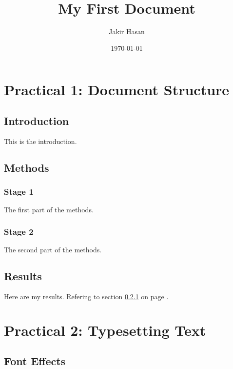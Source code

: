 \documentclass[a4paper, 12pt]{report}
\begin{document}
\title{My First Document}
\author{Jakir Hasan}
\date{\today}
\maketitle

\tableofcontents
\listoftables
\listoffigures
\newpage
{}

\setcounter{chapter}{1}

\chapter*{Practical 1: Document Structure}

\section{Introduction}
This is the introduction.

\section{Methods}

\subsection{Stage 1}
\label{sec1}
The first part of the methods.

\subsection{Stage 2}
The second part of the methods.

\section{Results}
Here are my results. Refering to section \ref{sec1} on page \pageref{sec1}.


\setcounter{chapter}{2}
\chapter*{Practical 2: Typesetting Text}

\section{Font Effects}
\end{document}
